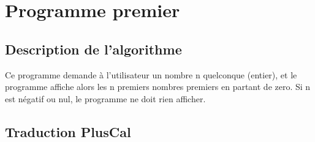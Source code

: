 \documentclass{scrreprt}
\begin{document}
%
%
%

\chapter{Programme premier}

\section{Description de l'algorithme}
Ce programme demande à l'utilisateur un nombre n quelconque (entier), et le programme affiche alors les n premiers nombres premiers en partant de zero. Si n est négatif ou nul, le programme ne doit rien afficher.

\section{Traduction PlusCal}
\end{document}
